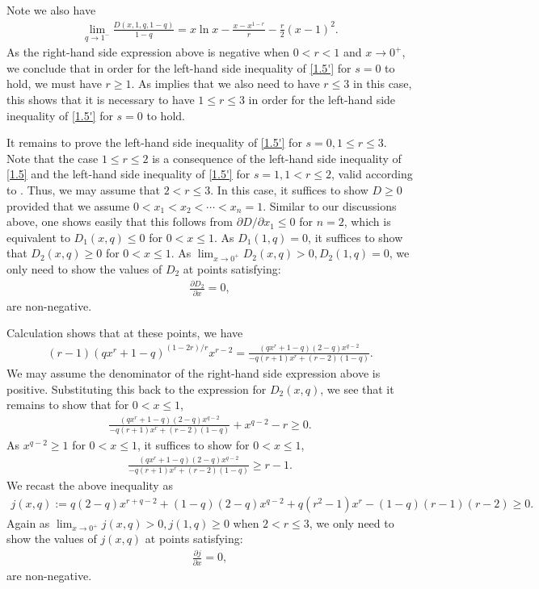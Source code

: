 \documentclass[11pt]{amsart}
\numberwithin{equation}{section}
\theoremstyle{definition}
\theoremstyle{remark}
\begin{document}
    Note we also have
\begin{align*}
  \lim_{q \rightarrow 1^-}\frac {D(x,1, q, 1-q)}{1-q}=x\ln x-\frac {x-x^{1-r}}{r}-\frac {r}{2}(x-1)^2.
\end{align*}
    As the right-hand side expression above is negative when $0<r<1$ and $x \rightarrow 0^+$, we conclude that in order for the left-hand side inequality of \eqref{1.5'} for $s=0$ to hold, we must have $r \geq 1$. As \cite[Lemma 3.1]{G4} implies that we also need to have $r \leq 3$ in this case, this shows that it is necessary to have $1 \leq r \leq 3$ in order for the left-hand side inequality of \eqref{1.5'} for $s=0$ to hold.

  It remains to prove the left-hand side inequality of \eqref{1.5'} for $s=0, 1 \leq r \leq 3$. Note that the case $1 \leq r \leq 2$ is a consequence of the left-hand side inequality of \eqref{1.5} and the left-hand side inequality of \eqref{1.5'} for $s=1, 1 < r \leq 2$, valid according to \cite[Theorem 3.2]{G4}. Thus, we may assume that $2 < r \leq 3$. In this case, it suffices to show $D \geq 0$ provided that we assume $0<x_1<x_2<\cdots <x_n=1$. Similar to our discussions above, one shows easily that this follows from $\partial D/\partial x_1 \leq 0$ for $n=2$, which is equivalent to $D_1(x,q) \leq 0$ for $0<x \leq 1$. As $D_1(1,q)=0$, it suffices to show that $D_2(x,q) \geq 0$ for $0<x \leq 1$. As $\lim_{x \rightarrow 0^+}D_2(x,q)>0, D_2(1,q)=0$, we only need to show the values of $D_2$ at points satisfying:
\begin{align*}
   \frac {\partial D_2}{\partial x}=0,
\end{align*}
  are non-negative.

   Calculation shows that at these points, we have
\begin{align*}
   (r-1)(qx^r+1-q)^{(1-2r)/r}x^{r-2}=\frac {(qx^r+1-q)(2-q)x^{q-2}}{-q(r+1)x^r+(r-2)(1-q)}.
\end{align*}
   We may assume the denominator of the right-hand side expression above is positive. Substituting this back to the expression for $D_2(x,q)$, we see that it remains to show that for $0 < x \leq 1$,
\begin{align*}
   \frac {(qx^r+1-q)(2-q)x^{q-2}}{-q(r+1)x^r+(r-2)(1-q)}+x^{q-2}-r \geq 0.
\end{align*}
   As $x^{q-2} \geq 1$ for $0 < x \leq 1$, it suffices to show for $0 < x \leq 1$,
\begin{align*}
   \frac {(qx^r+1-q)(2-q)x^{q-2}}{-q(r+1)x^r+(r-2)(1-q)}\geq r-1.
\end{align*}
   We recast the above inequality as
\begin{align*}
   j(x,q):=q(2-q)x^{r+q-2}+(1-q)(2-q)x^{q-2}+q(r^2-1)x^r -(1-q)(r-1)(r-2)\geq 0.
\end{align*}
   Again as $\lim_{x \rightarrow 0^+}j(x,q)>0, j(1,q) \geq 0$ when $2 < r \leq 3$, we only need to show the values of $j(x,q)$ at points satisfying:
\begin{align*}
   \frac {\partial j}{\partial x}=0,
\end{align*}
  are non-negative.
\end{document}
